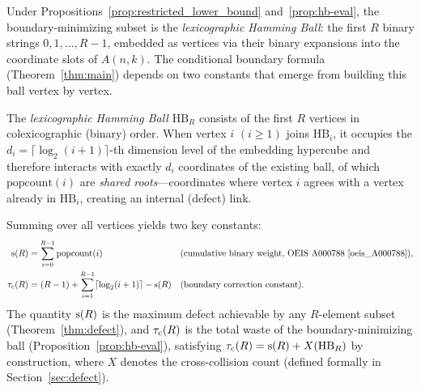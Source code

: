 Under Propositions~\ref{prop:restricted_lower_bound} and~\ref{prop:hb-eval}, the
boundary-minimizing subset is the \emph{lexicographic Hamming Ball}: the first
$R$ binary strings $0, 1, \ldots, R-1$, embedded as vertices via their binary
expansions into the coordinate slots of $A(n,k)$. The conditional
boundary formula (Theorem~\ref{thm:main}) depends on two constants
that emerge from building this ball vertex by vertex.

\begin{definition}\label{def:constants}
The \emph{lexicographic Hamming Ball} $\mathrm{HB}_R$ consists of the first $R$
vertices in colexicographic (binary) order. When vertex $i$ $(i \ge 1)$ joins
$\mathrm{HB}_{i}$, it occupies the $d_i = \lceil \log_2(i+1) \rceil$-th
dimension level of the embedding hypercube and therefore interacts with exactly
$d_i$ coordinates of the existing ball, of which $\mathrm{popcount}(i)$ are
\emph{shared roots}---coordinates where vertex $i$ agrees with a vertex already
in $\mathrm{HB}_{i}$, creating an internal (defect) link.

	Summing over all vertices yields two key constants:
	\begin{align}
		\mathrm{s}(R)   & = \sum_{i=0}^{R-1} \mathrm{popcount}(i)                         &  & \text{(cumulative binary weight, OEIS A000788 \cite{oeis_A000788})}, \label{eq:eseq} \\
		\tau_{\mathrm{c}}(R) & = (R-1) + \sum_{i=1}^{R-1} \lceil \log_2(i+1) \rceil - \mathrm{s}(R) &  & \text{(boundary correction constant)}. \label{eq:cconst-def}
	\end{align}
The quantity $\mathrm{s}(R)$ is the maximum defect achievable by any $R$-element
subset (Theorem~\ref{thm:defect}), and $\tau_{\mathrm{c}}(R)$ is the total waste of the
boundary-minimizing ball (Proposition~\ref{prop:hb-eval}), satisfying
$\tau_{\mathrm{c}}(R) = \mathrm{s}(R) + X(\mathrm{HB}_R)$ by construction, where $X$ denotes
the cross-collision count (defined formally in Section~\ref{sec:defect}).
\end{definition}

